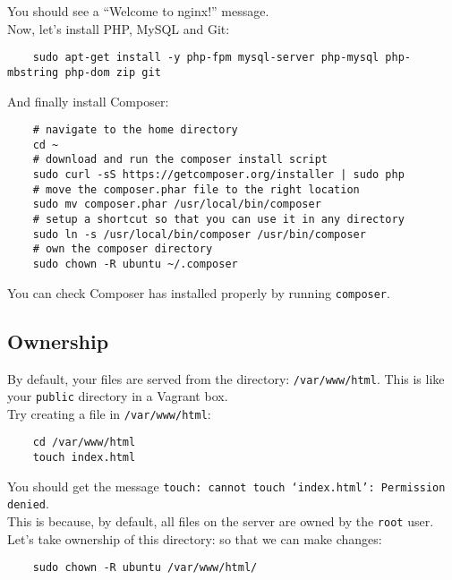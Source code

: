You should see a ``Welcome to nginx!'' message.
\\

Now, let's install PHP,  MySQL and Git:

\begin{verbatim}
    sudo apt-get install -y php-fpm mysql-server php-mysql php-mbstring php-dom zip git
\end{verbatim}

And finally install Composer:

\begin{verbatim}
    # navigate to the home directory
    cd ~
    # download and run the composer install script
    sudo curl -sS https://getcomposer.org/installer | sudo php
    # move the composer.phar file to the right location
    sudo mv composer.phar /usr/local/bin/composer
    # setup a shortcut so that you can use it in any directory
    sudo ln -s /usr/local/bin/composer /usr/bin/composer
    # own the composer directory
    sudo chown -R ubuntu ~/.composer
\end{verbatim}

You can check Composer has installed properly by running \texttt{composer}.


\subsection{Ownership}

By default, your files are served from the directory: \texttt{/var/www/html}. This is like your \texttt{public} directory in a Vagrant box.
\\

Try creating a file in \texttt{/var/www/html}:

\begin{verbatim}
    cd /var/www/html
    touch index.html
\end{verbatim}

You should get the message \texttt{touch: cannot touch `index.html': Permission denied}.
\\

This is because, by default, all files on the server are owned by the \texttt{root} user.
\\

Let's take ownership of this directory: so that we can make changes:

\begin{verbatim}
    sudo chown -R ubuntu /var/www/html/
\end{verbatim}

